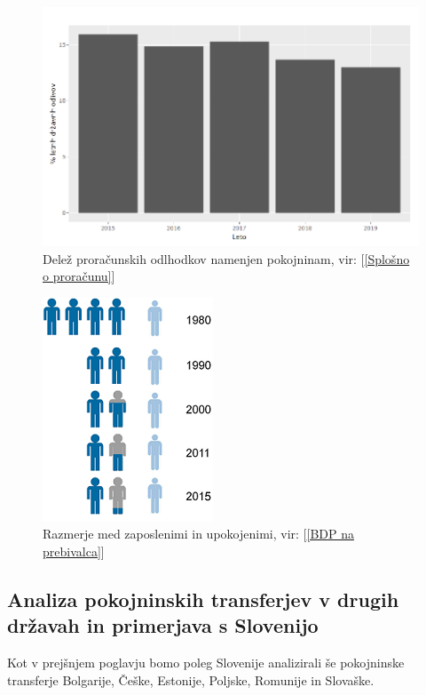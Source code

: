 \documentclass[12pt, a4paper]{article}
\begin{document}
\begin{figure}[t!]
\centering
\includegraphics[height = 7 cm]{pokojnine_procentualno.png}
\caption{Delež proračunskih odlhodkov namenjen pokojninam, vir: [\ref{Splošno o proračunu}]}
\label{Slika 7}
\end{figure}

\begin{figure}[h!]
\centering
\includegraphics[height = 9 cm]{razmerje_med_zaposlenimi_in_upokojenimi_2015.png}
\caption{Razmerje med zaposlenimi in upokojenimi, vir: [\ref{BDP na prebivalca}]}
\label{Slika 8}
\end{figure}

\newpage

\newpage
\subsection{Analiza pokojninskih transferjev v drugih državah in primerjava s Slovenijo}
\hspace*{5mm} Kot v prejšnjem poglavju bomo poleg Slovenije analizirali še pokojninske transferje Bolgarije, Češke, Estonije, Poljske, Romunije in Slovaške.
\end{document}
